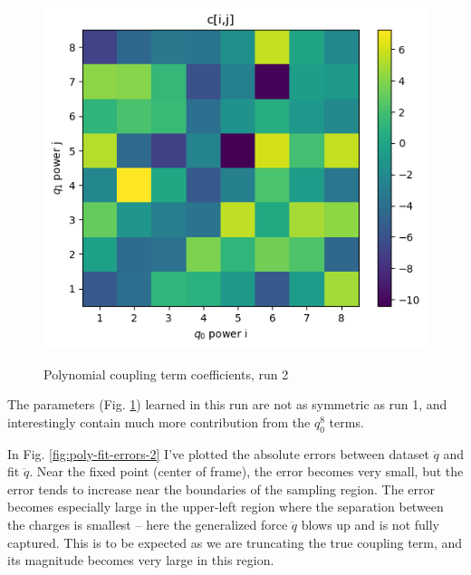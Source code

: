\documentclass[]{article}
\begin{document}
\begin{figure}[H]
	\caption{Polynomial coupling term coefficients, run 2}
	\centering
	\includegraphics[scale=0.60]{poly-coupling-parameters-2.png}
	\label{fig:poly-coupling-parameters-2}
\end{figure}

The parameters (Fig. \ref{fig:poly-coupling-parameters-2}) learned in this run are not as symmetric as run 1, and interestingly contain much more contribution from the $q_0^8$ terms.


In Fig. \ref{fig:poly-fit-errors-2} I've plotted the absolute errors between dataset $\ddot{q}$ and fit $\ddot{q}$. Near the fixed point (center of frame), the error becomes very small, but the error tends to increase near the boundaries of the sampling region. The error becomes especially large in the upper-left region where the separation between the charges is smallest -- here the generalized force $\ddot{q}$ blows up and is not fully captured. This is to be expected as we are truncating the true coupling term, and its magnitude becomes very large in this region.
\end{document}
